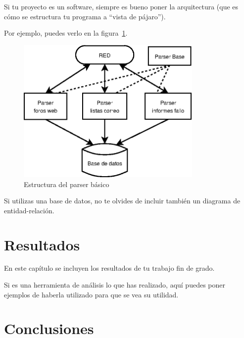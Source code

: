 \documentclass[a4paper, 12pt, english]{book}
\begin{document}
Si tu proyecto es un software, siempre es bueno poner la arquitectura (que es cómo se estructura tu programa a ``vista de pájaro'').

Por ejemplo, puedes verlo en la figura~\ref{fig:arquitectura}.

\begin{figure}
  \centering
  \includegraphics[width=9cm, keepaspectratio]{img/arquitectura}
  \caption{Estructura del parser básico}
  \label{fig:arquitectura}
\end{figure}

Si utilizas una base de datos, no te olvides de incluir también un diagrama de entidad-relación.



\cleardoublepage
\chapter{Resultados}

En este capítulo se incluyen los resultados de tu trabajo fin de grado.

Si es una herramienta de análisis lo que has realizado, aquí puedes poner ejemplos de haberla utilizado para que se vea su utilidad.



\cleardoublepage
\chapter{Conclusiones}
\label{chap:conclusiones}
\end{document}
